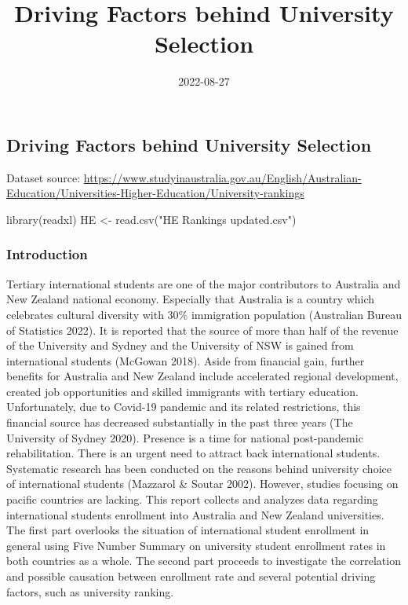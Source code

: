 \documentclass[
]{article}
\title{Driving Factors behind University Selection}
\author{}
\date{\vspace{-2.5em}2022-08-27}
\newenvironment{Shaded}{\begin{snugshade}}{\end{snugshade}}
\newcommand{\FunctionTok}[1]{\textcolor[rgb]{0.00,0.00,0.00}{#1}}
\newcommand{\NormalTok}[1]{#1}
\newcommand{\OtherTok}[1]{\textcolor[rgb]{0.56,0.35,0.01}{#1}}
\newcommand{\StringTok}[1]{\textcolor[rgb]{0.31,0.60,0.02}{#1}}
\begin{document}
\maketitle

\hypertarget{driving-factors-behind-university-selection}{%
\subsection{Driving Factors behind University
Selection}\label{driving-factors-behind-university-selection}}

Dataset source:
\url{https://www.studyinaustralia.gov.au/English/Australian-Education/Universities-Higher-Education/University-rankings}

\begin{Shaded}
\begin{Highlighting}[]
\FunctionTok{library}\NormalTok{(readxl)}
\NormalTok{HE }\OtherTok{\textless{}{-}} \FunctionTok{read.csv}\NormalTok{(}\StringTok{"HE Rankings updated.csv"}\NormalTok{)}
\end{Highlighting}
\end{Shaded}

\hypertarget{introduction}{%
\subsubsection{Introduction}\label{introduction}}

Tertiary international students are one of the major contributors to
Australia and New Zealand national economy. Especially that Australia is
a country which celebrates cultural diversity with 30\% immigration
population (Australian Bureau of Statistics 2022). It is reported that
the source of more than half of the revenue of the University and Sydney
and the University of NSW is gained from international students (McGowan
2018). Aside from financial gain, further benefits for Australia and New
Zealand include accelerated regional development, created job
opportunities and skilled immigrants with tertiary education.
Unfortunately, due to Covid-19 pandemic and its related restrictions,
this financial source has decreased substantially in the past three
years (The University of Sydney 2020). Presence is a time for national
post-pandemic rehabilitation. There is an urgent need to attract back
international students. Systematic research has been conducted on the
reasons behind university choice of international students (Mazzarol \&
Soutar 2002). However, studies focusing on pacific countries are
lacking. This report collects and analyzes data regarding international
students enrollment into Australia and New Zealand universities. The
first part overlooks the situation of international student enrollment
in general using Five Number Summary on university student enrollment
rates in both countries as a whole. The second part proceeds to
investigate the correlation and possible causation between enrollment
rate and several potential driving factors, such as university ranking.
\end{document}
